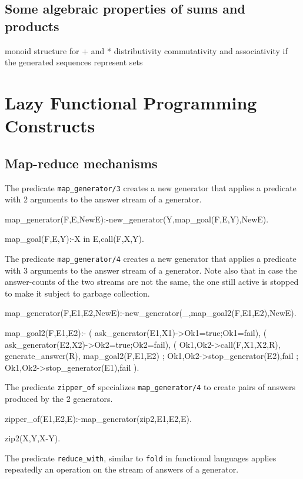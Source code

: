 \documentclass{new_tlp}
\begin{document}
\EX
\subsection{Some algebraic properties of sums and products}

\BI
\I monoid structure for + and *
\I distributivity
\I commutativity and associativity if the generated sequences represent sets
\EI

\begin{code}
\end{code}

\section{Lazy Functional Programming Constructs}

\subsection{Map-reduce mechanisms}

The predicate {\tt map\_generator/3} creates a new generator that
applies a predicate with 2 arguments to the answer stream  of a generator.
\begin{code}
map_generator(F,E,NewE):-new_generator(Y,map_goal(F,E,Y),NewE).

map_goal(F,E,Y):-X in E,call(F,X,Y).
\end{code}

The predicate {\tt map\_generator/4} creates a new generator that
applies a predicate with 3 arguments to the answer stream  of a generator.
Note also that in case the answer-counts of the two streams are not the same, the one
still active is stopped to make it subject to garbage collection.
\begin{code}
map_generator(F,E1,E2,NewE):-new_generator(_,map_goal2(F,E1,E2),NewE).

map_goal2(F,E1,E2):-
  ( ask_generator(E1,X1)->Ok1=true;Ok1=fail),
  ( ask_generator(E2,X2)->Ok2=true;Ok2=fail),
  ( Ok1,Ok2->call(F,X1,X2,R),
    generate_answer(R),
    map_goal2(F,E1,E2)
  ; \+Ok1,Ok2->stop_generator(E2),fail
  ; Ok1,\+Ok2->stop_generator(E1),fail
  ).
\end{code}

The predicate {\tt zipper\_of} specializes {\tt map\_generator/4} to create
pairs of answers produced by the 2 generators.
\begin{code}
zipper_of(E1,E2,E):-map_generator(zip2,E1,E2,E).

zip2(X,Y,X-Y).
\end{code}
The predicate {\tt reduce\_with}, similar to {\tt fold} in functional languages
applies repeatedly an operation on the stream of answers of a generator.
\end{document}
